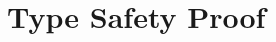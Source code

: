 \documentclass[showabstract,showacknowledgments,showpreface,showdedication]{iuphd}
\theoremstyle{nonumberplain}
\begin{document}
\appendix



\chapter{Type Safety Proof}\label{appendix:proof}






%



\end{document}
